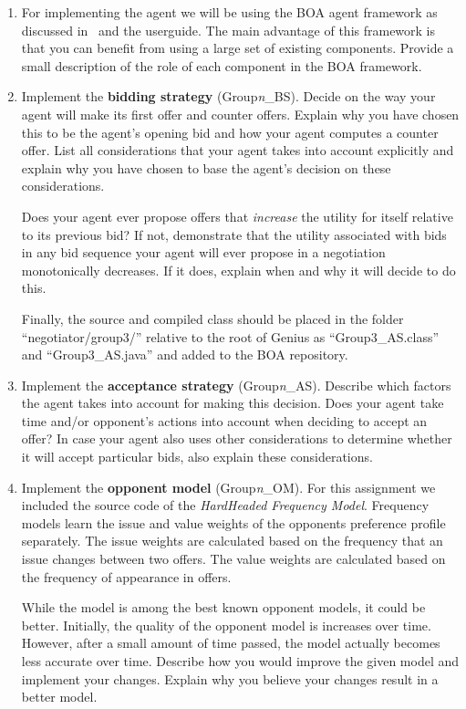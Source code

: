 \documentclass[a4paper]{article}
\begin{document}
\begin{enumerate}
\begin{enumerate}
 	 \item For implementing the agent we will be using the BOA agent framework as discussed in~\cite{Baarslag12ACAN} and the userguide. The main advantage of this framework is that you can benefit from using a large set of existing components. Provide a small description of the role of each component in the BOA framework.
        \item Implement the \textbf{bidding strategy} (Group\textit{n}\_BS). Decide on the way your agent will make its first offer and counter offers. Explain why you have chosen this to be the agent's opening bid and how your agent computes a counter offer. List all considerations that your agent takes into account explicitly and explain why you have chosen to base the agent's decision on these considerations.

Does your agent ever propose offers that {\em increase} the utility for itself relative to its previous bid? If not, demonstrate that the utility associated with bids in any bid sequence your agent will ever propose in a negotiation monotonically decreases. If it does, explain when and why it will decide to do this.

Finally, the source and compiled class should be placed in the folder ``negotiator/group3/'' relative to the root of Genius as ``Group3\_AS.class'' and ``Group3\_AS.java'' and added to the BOA repository.

        \item Implement the \textbf{acceptance strategy} (Group\textit{n}\_AS). Describe which factors the agent takes into account for making this decision. Does your agent take time and/or opponent's actions into account when deciding to accept an offer? In case your agent also uses other considerations to determine whether it will accept particular bids, also explain these considerations.
       \item Implement the \textbf{opponent model} (Group\textit{n}\_OM). For this assignment we included the source code of the \textit{HardHeaded Frequency Model}. Frequency models learn the issue and value weights of the opponents preference profile separately. The issue weights are calculated based on the frequency that an issue changes between two offers. The value weights are calculated based on the frequency of appearance in offers.

While the model is among the best known opponent models, it could be better. Initially, the quality of the opponent model is increases over time. However, after a small amount of time passed, the model actually becomes less accurate over time. Describe how you would improve the given model and implement your changes. Explain why you believe your changes result in a better model.


\end{enumerate}
\end{enumerate}
\end{document}
